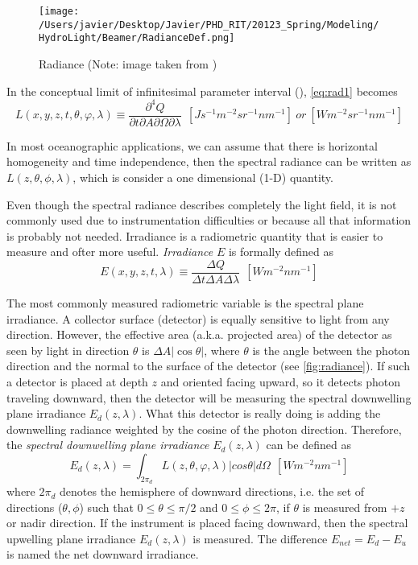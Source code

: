 \begin{figure}[htb]
  \centering
  \texttt{[image: /Users/javier/Desktop/Javier/PHD\_RIT/20123\_Spring/Modeling/HydroLight/Beamer/RadianceDef.png]}
\caption{Radiance (Note: image taken from \cite{Mobley:2001})}
\label{fig:radiance} 
\end{figure}

In the conceptual limit of infinitesimal parameter interval (\cite{Mobley:2001}), \autoref{eq:rad1} becomes
\begin{equation}
  L(x,y,z,t,\theta,\varphi,\lambda)\equiv\frac{\partial^4 Q}{\partial t\partial A\partial\Omega\partial\lambda}~~\left[ Js^{-1}m^{-2}sr^{-1}nm^{-1} \right]~or~\left[ W m^{-2}sr^{-1}nm^{-1} \right]
\end{equation}

In most oceanographic applications, we can assume that there is horizontal homogeneity and time independence, then the spectral radiance can be written as $L(z,\theta,\phi,\lambda)$, which is consider a one dimensional (1-D) quantity.

Even though the spectral radiance describes completely the light field, it is not commonly used due to instrumentation difficulties or because all that information is probably not needed. Irradiance is a radiometric quantity that is easier to measure and ofter more useful. {\it Irradiance} $E$ is formally defined as
\begin{equation}
  E(x,y,z,t,\lambda) \equiv \frac{\Delta Q}{\Delta t\Delta A\Delta\lambda}~~\left[ W m^{-2}nm^{-1} \right]
\end{equation}

The most commonly measured radiometric variable is the spectral plane irradiance. A collector surface (detector) is equally sensitive to light from any direction. However, the effective area (a.k.a. projected area) of the detector as seen by light in direction $\theta$ is $\Delta A|\cos{\theta}|$, where $\theta$ is the angle between the photon direction and the normal to the surface of the detector (see \autoref{fig:radiance}). If such a detector is placed at depth $z$ and oriented facing upward, so it detects photon traveling downward, then the detector will be measuring the spectral downwelling plane irradiance $E_d(z,\lambda)$. What this detector is really doing is adding the downwelling radiance weighted by the cosine of the photon direction. Therefore, the {\it spectral downwelling plane irradiance} $E_d(z,\lambda)$ can be defined as
\begin{equation}
  E_{d}(z,\lambda)=\int_{2\pi_d} L(z,\theta,\varphi,\lambda)|cos\theta|d\Omega~~\left[Wm^{-2}nm^{-1} \right]
\end{equation}
where $2\pi_d$ denotes the hemisphere of downward directions, i.e. the set of directions ($\theta,\phi$) such that $0\leq\theta\leq\pi/2$ and $0\leq\phi\leq2\pi$, if $\theta$ is measured from $+z$ or nadir direction. If the instrument is placed facing downward, then the spectral upwelling plane irradiance $E_d(z,\lambda)$ is measured. The difference $E_{net}=E_d-E_u$ is named the net downward irradiance.

